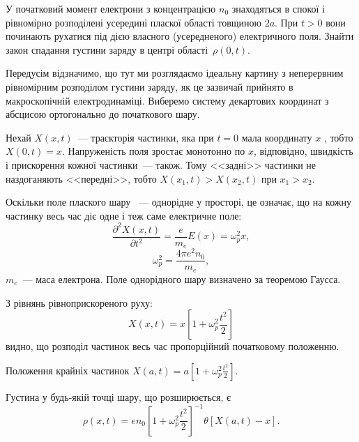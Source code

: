\begin{problem}
У початковий момент електрони з концентрацією $n_0$   знаходяться в спокої і рівномірно розподілені усередині пласкої області товщиною $2a$. При $t>0$  вони починають рухатися під дією власного (усередненого) електричного поля. Знайти закон спадання густини заряду в центрі області~$\rho(0,t)$.
\begin{solution}
	Передусім відзначимо, що тут ми розглядаємо ідеальну картину з неперервним рівномірним розподілом густини заряду, як це зазвичай прийнято в макроскопічній електродинаміці. Виберемо систему декартових координат з абсцисою ортогонально до початкового шару.

	Нехай $X(x,t)$~--- траєкторія частинки, яка при $t = 0$   мала координату $x$ , тобто $X(0,t) = x$. Напруженість поля зростає монотонно по $x$, відповідно, швидкість і прискорення кожної частинки~--- також. Тому <<задні>> частинки не наздоганяють <<передні>>, тобто  $X(x_1,t) > X(x_2,t)$  при ${x_1} > {x_2}$.



		Оскільки поле плаского шару ~--- однорідне у просторі, це означає, що на кожну частинку весь час діє одне і теж саме електричне поле:
		\[
			\frac{{{\partial ^2}X(x,t)}}{{\partial {t^2}}} = \frac{e}{m_e}E(x) = \omega _p^2x,
		\]
		\[
			\omega _p^2 = \frac{{4\pi {e^2}{n_0}}}{m_e},
		\]
	$m_e$~--- маса електрона. Поле однорідного шару визначено за теоремою Гаусса.

		З рівнянь рівноприскореного руху:
		\[
			X(x,t) = x\left[ {1 + \omega _p^2\frac{{{t^2}}}{2}} \right]
		\]
		видно, що розподіл частинок весь час пропорційний початковому положенню.


		Положення крайніх частинок $X(a,t) = a\left[ {1 + \omega _p^2\frac{{{t^2}}}{2}} \right]$.

        \clearpage

	Густина у будь-якій точці шару, що розширюється, є
	\[
		\rho (x,t) = e{n_0}{\left[ {1 + \omega _p^2\frac{{{t^2}}}{2}} \right]^{ - 1}}\theta \left[ {X(a,t) - x} \right].
	\]
\end{solution}
\end{problem}


